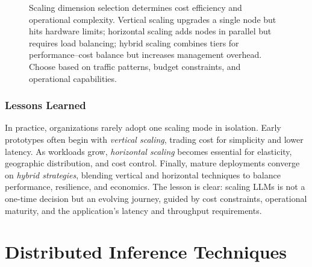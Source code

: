 \begin{figure}[t]
\begin{llmfigbox}
\end{llmfigbox}
\caption{Scaling dimension selection determines cost efficiency and operational complexity. Vertical scaling upgrades a single node but hits hardware limits; horizontal scaling adds nodes in parallel but requires load balancing; hybrid scaling combines tiers for performance--cost balance but increases management overhead. Choose based on traffic patterns, budget constraints, and operational capabilities.}
\label{fig:ch06_scaling_dimensions}
\end{figure}

\subsubsection{Lessons Learned}
In practice, organizations rarely adopt one scaling mode in isolation. Early prototypes often begin with \emph{vertical scaling}, trading cost for simplicity and lower latency. As workloads grow, \emph{horizontal scaling} becomes essential for elasticity, geographic distribution, and cost control. Finally, mature deployments converge on \emph{hybrid strategies}, blending vertical and horizontal techniques to balance performance, resilience, and economics. The lesson is clear: scaling LLMs is not a one-time decision but an evolving journey, guided by cost constraints, operational maturity, and the application’s latency and throughput requirements.

\section{Distributed Inference Techniques}
\label{sec:distributed-inference}
